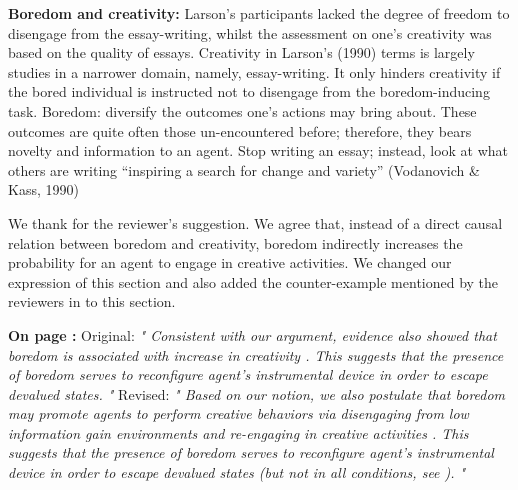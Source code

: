 \documentclass[utf8]{article}
\newenvironment{reply}  
    {\color{Blue}\noindent\newline}
    {\newline}
\newcommand{\revise}[3]{
    \noindent
    \newline
    \textbf{On page {#1}:}\newline
    \newline
    Original:\newline
    \textit{"#2"}
    \newline
    \newline
    Revised:\newline
    \textit{"#3"}\newline}
\begin{document}
        \begin{reply}
            \textbf{Boredom and creativity:}
            Larson's participants lacked the degree of freedom to disengage from the essay-writing, whilst the assessment on one's creativity was based on the quality of essays.
            Creativity in Larson's (1990) terms is largely studies in a narrower domain, namely, essay-writing. It only hinders creativity if the bored individual is instructed not to disengage from the boredom-inducing task.
            Boredom: diversify the outcomes one's actions may bring about. These outcomes are quite often those un-encountered before; therefore, they bears novelty and information to an agent. 
            Stop writing an essay; instead, look at what others are writing
            ``inspiring a search for change and variety'' (Vodanovich & Kass, 1990)
            
            
            We thank for the reviewer's suggestion. We agree that, instead of a direct causal relation between boredom and creativity, boredom indirectly increases the probability for an agent to engage in creative activities. We changed our expression of this section and also added the counter-example \citep{larson1990emotions} mentioned by the reviewers in to this section.
            
            \revise{\pageref{rev:creativity}}
                {
                  Consistent with our argument, evidence also showed that boredom is associated with increase in creativity \citep{harris2000correlates, schubert1977boredom, schubert1978creativity}. This suggests that the presence of boredom serves to reconfigure agent's instrumental device in order to escape devalued states.
                }
                {
                  Based on our notion, we also postulate that boredom may promote agents to perform creative behaviors via disengaging from low information gain environments and re-engaging in creative activities \citep{harris2000correlates, schubert1977boredom, schubert1978creativity}. This suggests that the presence of boredom serves to reconfigure agent's instrumental device in order to escape devalued states (but not in all conditions, see \cite{larson1990emotions}).
                }
        

        \end{reply}
        
        
        
\end{document}

